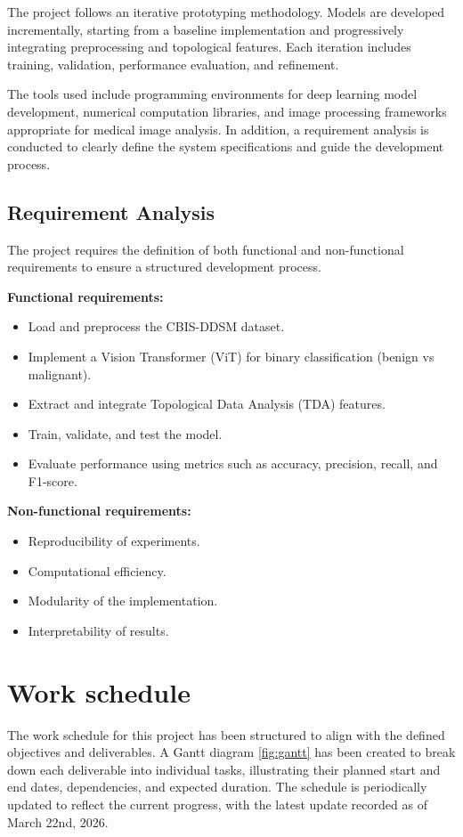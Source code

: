 \documentclass[ENG]{TFUOC}%
\begin{document}
The project follows an iterative prototyping methodology. Models are developed incrementally, starting from a baseline implementation and progressively integrating preprocessing and topological features. Each iteration includes training, validation, performance evaluation, and refinement.

The tools used include programming environments for deep learning model development, numerical computation libraries, and image processing frameworks appropriate for medical image analysis. In addition, a requirement analysis is conducted to clearly define the system specifications and guide the development process.

\subsection{Requirement Analysis}

The project requires the definition of both functional and non-functional requirements to ensure a structured development process.

\textbf{Functional requirements:}
\begin{itemize}
    \item Load and preprocess the CBIS-DDSM dataset.
    \item Implement a Vision Transformer (ViT) for binary classification (benign vs malignant).
    \item Extract and integrate Topological Data Analysis (TDA) features.
    \item Train, validate, and test the model.
    \item Evaluate performance using metrics such as accuracy, precision, recall, and F1-score.
\end{itemize}

\textbf{Non-functional requirements:}
\begin{itemize}
    \item Reproducibility of experiments.
    \item Computational efficiency.
    \item Modularity of the implementation.
    \item Interpretability of results.
\end{itemize}

\section{Work schedule}

The work schedule for this project has been structured to align with the defined objectives and deliverables. A Gantt diagram \ref{fig:gantt} has been created to break down each deliverable into individual tasks, illustrating their planned start and end dates, dependencies, and expected duration. The schedule is periodically updated to reflect the current progress, with the latest update recorded as of March 22nd, 2026.
\end{document}
